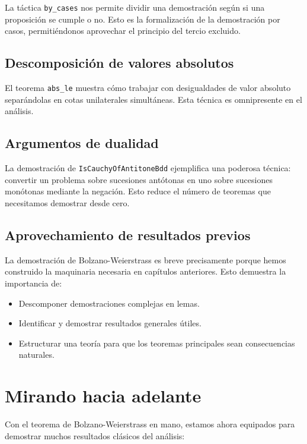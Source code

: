 La táctica \texttt{by\_cases} nos permite dividir una demostración según
si una proposición se cumple o no. Esto es la formalización de la
demostración por casos, permitiéndonos aprovechar el principio del
tercio excluido.

\subsection{Descomposición de valores absolutos}

El teorema \texttt{abs\_le} muestra cómo trabajar con desigualdades de
valor absoluto separándolas en cotas unilaterales simultáneas. Esta
técnica es omnipresente en el análisis.

\subsection{Argumentos de dualidad}

La demostración de \texttt{IsCauchyOfAntitoneBdd} ejemplifica una
poderosa técnica: convertir un problema sobre sucesiones antótonas en
uno sobre sucesiones monótonas mediante la negación. Esto reduce el
número de teoremas que necesitamos demostrar desde cero.

\subsection{Aprovechamiento de resultados previos}

La demostración de Bolzano-Weierstrass es breve precisamente porque
hemos construido la maquinaria necesaria en capítulos anteriores.
Esto demuestra la importancia de:

\begin{itemize}
  \item Descomponer demostraciones complejas en lemas.
  \item Identificar y demostrar resultados generales útiles.
  \item Estructurar una teoría para que los teoremas principales sean
        consecuencias naturales.
\end{itemize}

\section{Mirando hacia adelante}

Con el teorema de Bolzano-Weierstrass en mano, estamos ahora equipados
para demostrar muchos resultados clásicos del análisis:


